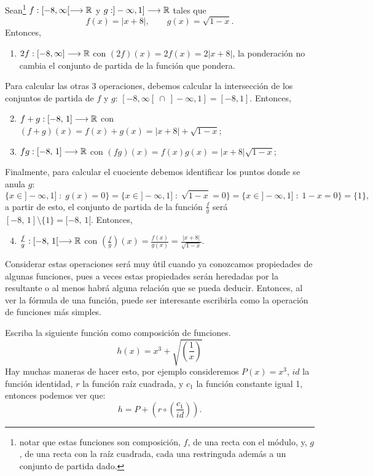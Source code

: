 \vspace{1cm}

\begin{ejemplo}
		Sean\footnote{notar que estas funciones son composición, $f$, de una recta con el módulo, y, $g$, de una recta con la raíz cuadrada, cada una restringuda además a un conjunto de partida dado.} $f: [-8,\infty[ \longrightarrow \mathbb{R}$ y $g: ]-\infty,1] \longrightarrow \mathbb{R}$ tales que
		\[
			f(x) = |x+8|,\qquad g(x) = \sqrt{1-x}.
		\]
		Entonces,
		\begin{enumerate}
			\item $2f : [-8,\infty] \longrightarrow \mathbb{R}$ con $(2f)(x) = 2f(x) = 2|x+8|$, la ponderación no cambia el conjunto de partida de la función que pondera.
		\end{enumerate}
Para calcular las otras 3 operaciones, debemos calcular la intersección de los conjuntos de partida de $f$ y $g$: $[-8,\infty[\ \cap\  ]-\infty,1]=[-8,1]$.
Entonces,
		\begin{enumerate} \setcounter{enumi}{1}
			\item $f+g: [-8,\,1] \longrightarrow \mathbb{R}$ con $(f+g)(x) = f(x) + g(x) = |x+8| + \sqrt{1-x}$;
			\item $fg: [-8,\,1] \longrightarrow \mathbb{R}$ con $(fg)(x) = f(x)g(x) = |x+8|\sqrt{1-x}$;
		\end{enumerate}
Finalmente, para calcular el cuociente debemos identificar los puntos donde se anula $g$: 
$$\{x \in ]-\infty,1]\;:\; g(x) = 0\}=\{x \in ]-\infty,1]\;:\; \sqrt{1-x} = 0\}=\{x \in ]-\infty,1]\;:\; 1-x = 0\}=\{1\},$$
a partir de esto, el conjunto de partida de la función $\frac{f}{g}$ será $ [-8,\,1]\setminus\{1\}= [-8,\,1[$.
Entonces,
		\begin{enumerate} \setcounter{enumi}{3}
			\item $\frac f g: [-8,\,1[ \longrightarrow \mathbb{R}$ con $(\frac f g)(x) = \frac {f(x)}{g(x)} = \frac{|x+8|}{\sqrt{1-x}}$.
		\end{enumerate}
\end{ejemplo}

Considerar estas operaciones será muy útil cuando ya conozcamos propiedades de algunas funciones, pues a veces estas propiedades serán heredadas por la resultante o al menos habrá alguna relación que se pueda deducir. 
Entonces, al ver la fórmula de una función, puede ser interesante escribirla como la operación de funciones más simples.

\begin{ejercicio}
Escriba la siguiente función como composición de funciones.
$$ h(x)=x^3+\sqrt{\left(\frac{1}{x}\right)}$$
Hay muchas maneras de hacer esto, por ejemplo consideremos $P(x)=x^3$, $id$ la función identidad, $r$ la función raíz cuadrada, y $c_1$ la función constante igual 1, entonces podemos ver que:
$$h=P+\left(r\circ\left(\frac{c_1}{id}\right)\right).$$
\end{ejercicio}

